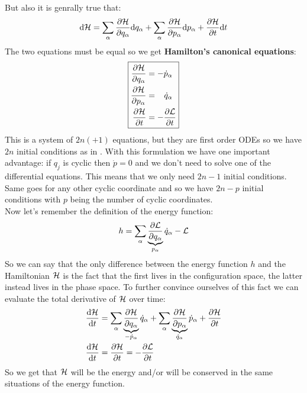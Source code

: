 But also it is genrally true that:
\begin{equation}
    \mathrm{d}\mathcal{H} = \displaystyle\sum_{\alpha} \dfrac{\partial \mathcal{H}}{\partial q_{\alpha}}\mathrm{d}q_{\alpha} + \displaystyle\sum_{\alpha} \dfrac{\partial \mathcal{H}}{\partial p_{\alpha}}\mathrm{d}p_{\alpha} + \dfrac{\partial \mathcal{H}}{\partial t}\mathrm{d}t
\end{equation}
The two equations must be equal so we get \textbf{Hamilton's canonical equations}:
\begin{equation} \label{hamilton_equations}
    \boxed{
    \begin{aligned}
        \dfrac{\partial \mathcal{H}}{\partial q_{\alpha}} &= -\dot{p}_{\alpha}\\
        \dfrac{\partial \mathcal{H}}{\partial p_{\alpha}} &=\;\;\;\dot{q}_{\alpha}\\
        \dfrac{\partial \mathcal{H}}{\partial t} &= -\dfrac{\partial \mathcal{L}}{\partial t}
    \end{aligned}}
\end{equation}
This is a system of $2n (+1)$ equations, but they are first order ODEs so we have $2n$ initial conditions as in \lagrangeref. With this formulation we have one important advantage: if $q_j$ is cyclic then $\dot{p} = 0$ and we don't need to solve one of the differential equations.
This means that we only need $2n-1$ initial conditions. Same goes for any other cyclic coordinate and so we have $2n-p$ initial conditions with $p$ being the number of cyclic coordinates.\\
Now let's remember the definition of the energy function:
\begin{equation}
    h = \displaystyle\sum_{\alpha}\underbrace{\dfrac{\partial \mathcal{L}}{\partial q_{\alpha}}}_{p_{\alpha}}\dot{q}_{\alpha} - \mathcal{L}
\end{equation}
So we can say that the only difference between the energy function $h$ and the Hamiltonian $\mathcal{H}$ is the fact that the first lives in the configuration space, the latter instead lives in the phase space.
To further convince ourselves of this fact we can evaluate the total derivative of $\mathcal{H}$ over time:
\begin{equation}
    \begin{split}
        \dfrac{\mathrm{d}\mathcal{H} }{\mathrm{d}t} &= \displaystyle\sum_{\alpha}\underbrace{\dfrac{\partial \mathcal{H}}{\partial q_{\alpha}}}_{-\dot{p}_{\alpha}}\dot{q}_{\alpha} + \displaystyle\sum_{\alpha}\underbrace{\dfrac{\partial \mathcal{H}}{\partial p_{\alpha}}}_{\dot{q}_{\alpha}}\dot{p}_{\alpha} + \dfrac{\partial \mathcal{H}}{\partial t} \\
        \dfrac{\mathrm{d}\mathcal{H} }{\mathrm{d}t} &= \dfrac{\partial \mathcal{H}}{\partial t} = -\dfrac{\partial \mathcal{L}}{\partial t}
    \end{split}
\end{equation}
So we get that $\mathcal{H}$ will be the energy and/or will be conserved in the same situations of the energy function.
